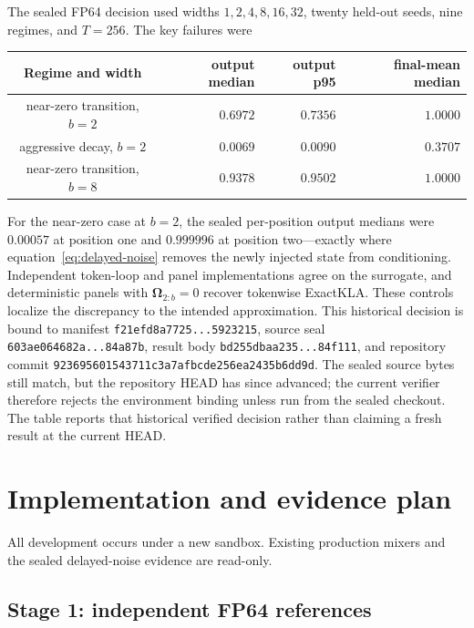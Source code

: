 \documentclass[11pt]{article}
\newcommand{\ve}[1]{\boldsymbol{#1}}
\begin{document}
The sealed FP64 decision used widths $1,2,4,8,16,32$, twenty held-out seeds, nine regimes, and
$T=256$.  The key failures were
\begin{center}
\begin{tabular}{crrr}
\toprule
Regime and width & output median & output p95 & final-mean median \\
\midrule
near-zero transition, $b=2$ & $0.6972$ & $0.7356$ & $1.0000$ \\
aggressive decay, $b=2$ & $0.0069$ & $0.0090$ & $0.3707$ \\
near-zero transition, $b=8$ & $0.9378$ & $0.9502$ & $1.0000$ \\
\bottomrule
\end{tabular}
\end{center}
For the near-zero case at $b=2$, the sealed per-position output medians were $0.00057$ at position
one and $0.999996$ at position two---exactly where equation~\eqref{eq:delayed-noise} removes the
newly injected state from conditioning.  Independent token-loop and panel implementations agree on
the surrogate, and deterministic panels with $\ve{\Omega}_{2:b}=0$ recover tokenwise ExactKLA.
These controls localize the discrepancy to the intended approximation.
This historical decision is bound to manifest
\texttt{f21efd8a7725...5923215}, source seal
\texttt{603ae064682a...84a87b}, result body
\texttt{bd255dbaa235...84f111}, and repository commit
\texttt{923695601543711c3a7afbcde256ea2435b6dd9d}.  The sealed source bytes still match, but the
repository HEAD has since advanced; the current verifier therefore rejects the environment binding
unless run from the sealed checkout.  The table reports that historical verified decision rather
than claiming a fresh result at the current HEAD.

\section{Implementation and evidence plan}

All development occurs under a new sandbox.  Existing production mixers and the sealed
delayed-noise evidence are read-only.

\subsection{Stage 1: independent FP64 references}
\end{document}
